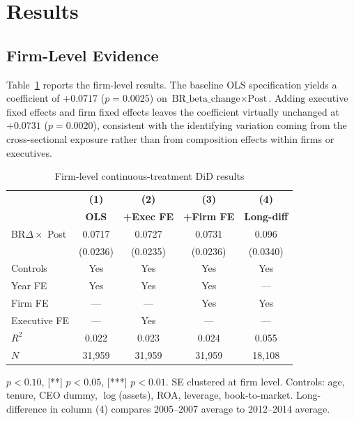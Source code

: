 \documentclass[11pt,a4paper]{article}
\begin{document}
\section{Results}
\label{sec:results}

\subsection{Firm-Level Evidence}

Table~\ref{tab:firm_did} reports the firm-level results. The baseline OLS specification yields a coefficient of $+0.0717$ ($p=0.0025$) on $\text{BR\_beta\_change} \times \text{Post}$. Adding executive fixed effects and firm fixed effects leaves the coefficient virtually unchanged at $+0.0731$ ($p=0.0020$), consistent with the identifying variation coming from the cross-sectional exposure rather than from composition effects within firms or executives.

\begin{table}[h!]
\centering
\begin{threeparttable}
\begin{tabular}{lcccc}
\toprule
 & \textbf{(1)} & \textbf{(2)} & \textbf{(3)} & \textbf{(4)} \\
 & \textbf{OLS} & \textbf{+Exec FE} & \textbf{+Firm FE} & \textbf{Long-diff} \\
\midrule
BR$\Delta \times$ Post & 0.0717\tnote{***} & 0.0727\tnote{***} & 0.0731\tnote{***} & 0.096\tnote{***} \\
 & (0.0236) & (0.0235) & (0.0236) & (0.0340) \\
Controls & Yes & Yes & Yes & Yes \\
Year FE & Yes & Yes & Yes & --- \\
Firm FE & --- & --- & Yes & Yes \\
Executive FE & --- & Yes & --- & --- \\
\midrule
$R^2$ & 0.022 & 0.023 & 0.024 & 0.055 \\
$N$ & 31,959 & 31,959 & 31,959 & 18,108 \\
\bottomrule
\end{tabular}
\begin{tablenotes}
\footnotesize
\item[*] $p<0.10$, [**] $p<0.05$, [***] $p<0.01$. SE clustered at firm level. Controls: age, tenure, CEO dummy, $\log$(assets), ROA, leverage, book-to-market. Long-difference in column (4) compares 2005--2007 average to 2012--2014 average.
\end{tablenotes}
\end{threeparttable}
\caption{Firm-level continuous-treatment DiD results}
\label{tab:firm_did}
\end{table}
\end{document}
